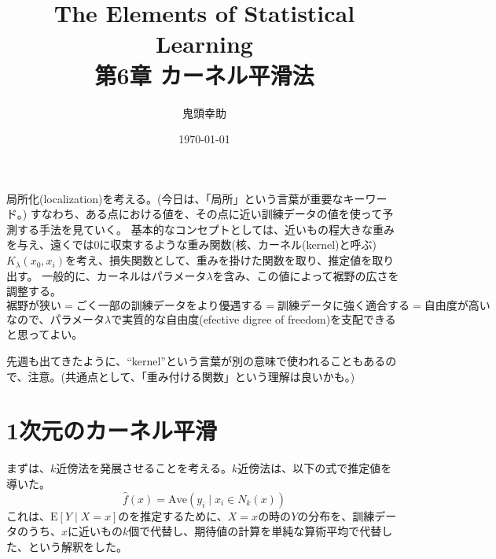 \documentclass{jsarticle}
\title{The Elements of Statistical Learning \\ 第6章 カーネル平滑法}
\author{鬼頭幸助}
\date{\today}
\begin{document}
\maketitle

局所化(localization)を考える。(今日は、「局所」という言葉が重要なキーワード。)
すなわち、ある点における値を、その点に近い訓練データの値を使って予測する手法を見ていく。
基本的なコンセプトとしては、近いもの程大きな重みを与え、遠くでは0に収束するような重み関数(核、カーネル(kernel)と呼ぶ)$K_{\lambda}(x_{0}, x_{i})$を考え、損失関数として、重みを掛けた関数を取り、推定値を取り出す。
一般的に、カーネルはパラメータ$\lambda$を含み、この値によって裾野の広さを調整する。
\[
  \mbox{裾野が狭い}=\mbox{ごく一部の訓練データをより優遇する}=\mbox{訓練データに強く適合する}=\mbox{自由度が高い}
\]
なので、パラメータ$\lambda$で実質的な自由度(efective digree of freedom)を支配できると思ってよい。

先週も出てきたように、``kernel''という言葉が別の意味で使われることもあるので、注意。(共通点として、「重み付ける関数」という理解は良いかも。)

\section{1次元のカーネル平滑}
まずは、$k$近傍法を発展させることを考える。$k$近傍法は、以下の式で推定値を導いた。
\[
  \hat{f}(x)=\mathrm{Ave}(y_{i} \mid x_{i} \in N_{k}(x))
\]
これは、$\mathrm{E}[Y \mid X=x]$のを推定するために、$X=x$の時の$Y$の分布を、訓練データのうち、$x$に近いもの$k$個で代替し、期待値の計算を単純な算術平均で代替した、という解釈をした。
\end{document}
